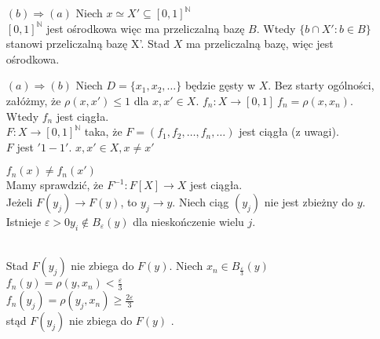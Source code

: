 \begin{dd} \hfill
    \begin{itemize} 
        \item[$(b) \Rightarrow (a)$] Niech $x \simeq X' \subseteq [0,1]^\mathbb{N}$ \\ 
            $[0,1]^\mathbb{N}$ jest ośrodkowa więc ma przeliczalną bazę $B$.
            Wtedy $ \{ b \cap X' : b \in B \}$ stanowi przeliczalną bazę X'. 
            Stad $X$ ma przeliczalną bazę, więc jest ośrodkowa. 
        \item[$(a) \Rightarrow (b)$] Niech $D = \{x_1,x_2,\ldots\}$ będzie gęsty w $X$. 
            Bez starty ogólności, załóżmy, że $\rho (x,x') \le 1$ dla $x,x' \in X$.
            $f_n : X \to [0,1] \ f_n = \rho (x,x_n)$. Wtedy $f_n$ jest ciągła. \\ 
            $ F: X \to [0,1]^\mathbb{N}$ taka, że $F = (f_1,f_2,\ldots,f_n,\ldots)$ jest ciągła (z uwagi). \\
            $F$ jest $'1-1'$. $x,x' \in X, x \neq x'$ \\ 
            $f_n(x) \neq f_n (x')$ \\ 
            Mamy sprawdzić, że $F^{-1} : F[X] \to X$ jest ciągła. \\
            Jeżeli $F(y_j) \to F(y)$, to $y_j \to y$.
            Niech ciąg $(y_j)$ nie jest zbieżny do $y$. Istnieje $\varepsilon > 0 
            y_i \notin B_\varepsilon (y)$ dla nieskończenie wielu $j$. \\ 
             \\ 
            Stad $F(y_j)$ nie zbiega do $F(y)$. Niech $x_n \in B_{\frac{\varepsilon}{3}} (y)$ \\
            $f_n (y) = \rho(y,x_n) < \frac{\varepsilon}{3}$ \\ 
            $f_n (y_j) = \rho(y_j,x_n) \ge \frac{2\varepsilon}{3}$ \\ 
            stąd $F(y_j)$ nie zbiega do $F(y)$ \lightning.
    \end{itemize} 
\end{dd} 

